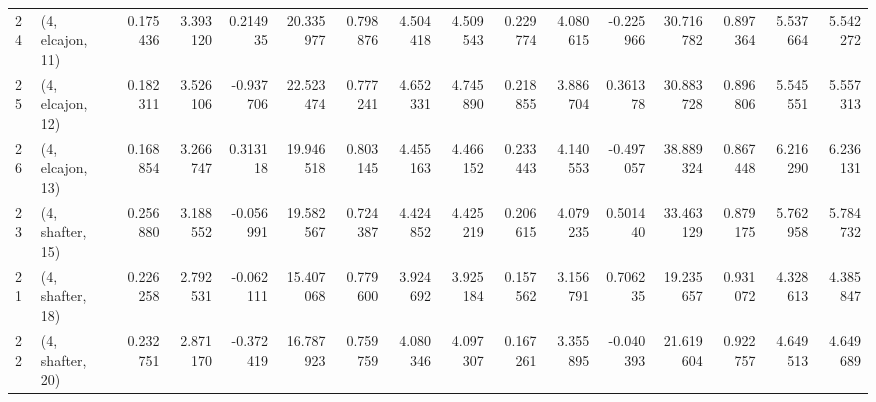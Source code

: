 \begin{tabular}{llrrrrrrrrrrrrrr}
24 &  (4, elcajon, 11) &   0.175436 &  3.393120 &  0.214935 &  20.335977 &  0.798876 &   4.504418 &  4.509543 &  0.229774 &  4.080615 & -0.225966 &   30.716782 &  0.897364 &   5.537664 &   5.542272 \\
25 &  (4, elcajon, 12) &   0.182311 &  3.526106 & -0.937706 &  22.523474 &  0.777241 &   4.652331 &  4.745890 &  0.218855 &  3.886704 &  0.361378 &   30.883728 &  0.896806 &   5.545551 &   5.557313 \\
26 &  (4, elcajon, 13) &   0.168854 &  3.266747 &  0.313118 &  19.946518 &  0.803145 &   4.455163 &  4.466152 &  0.233443 &  4.140553 & -0.497057 &   38.889324 &  0.867448 &   6.216290 &   6.236131 \\
23 &  (4, shafter, 15) &   0.256880 &  3.188552 & -0.056991 &  19.582567 &  0.724387 &   4.424852 &  4.425219 &  0.206615 &  4.079235 &  0.501440 &   33.463129 &  0.879175 &   5.762958 &   5.784732 \\
21 &  (4, shafter, 18) &   0.226258 &  2.792531 & -0.062111 &  15.407068 &  0.779600 &   3.924692 &  3.925184 &  0.157562 &  3.156791 &  0.706235 &   19.235657 &  0.931072 &   4.328613 &   4.385847 \\
22 &  (4, shafter, 20) &   0.232751 &  2.871170 & -0.372419 &  16.787923 &  0.759759 &   4.080346 &  4.097307 &  0.167261 &  3.355895 & -0.040393 &   21.619604 &  0.922757 &   4.649513 &   4.649689 \\
\bottomrule
\end{tabular}
